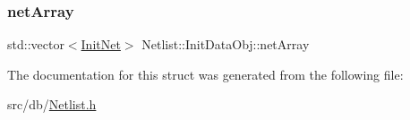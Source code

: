 \mbox{\label{structNetlist_1_1InitDataObj_a6da3cc62735730affa77954952d1f217}} 
\subsubsection{\texorpdfstring{net\+Array}{netArray}}
{\footnotesize\ttfamily std\+::vector$<$\hyperlink{structNetlist_1_1InitNet}{Init\+Net}$>$ Netlist\+::\+Init\+Data\+Obj\+::net\+Array}



The documentation for this struct was generated from the following file\+:\begin{DoxyCompactItemize}
\item 
src/db/\hyperlink{Netlist_8h}{Netlist.\+h}\end{DoxyCompactItemize}
